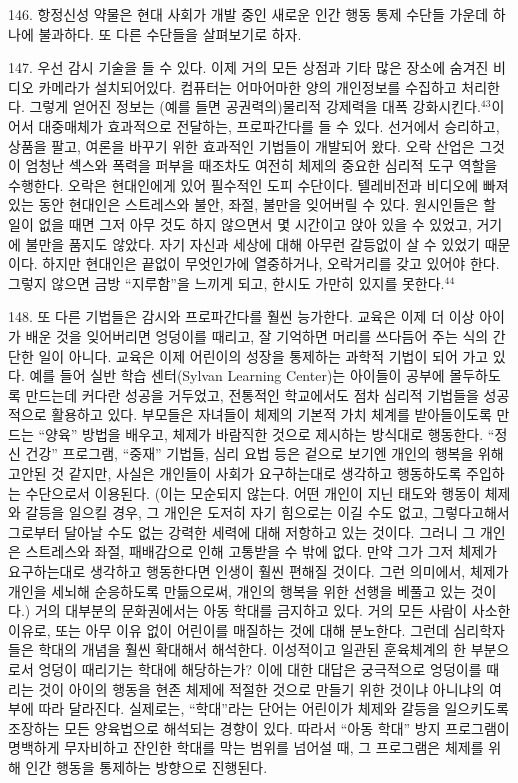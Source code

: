 \documentclass[11pt,a4paper]{article}
\begin{document}
\begin{multicols}{2}
146. 항정신성 약물은 현대 사회가 개발 중인 새로운 인간 행동 통제 수단들 가운데 하나에 불과하다. 또  다른 수단들을 살펴보기로 하자.  


147. 우선 감시 기술을 들 수 있다. 이제 거의 모든 상점과 기타 많은 장소에 숨겨진 비디오 카메라가  설치되어있다. 컴퓨터는 어마어마한 양의 개인정보를 수집하고 처리한다. 그렇게 얻어진 정보는 (예를  들면 공권력의)물리적 강제력을 대폭 강화시킨다.\hyperlink{43}{$^{43}$}이어서 대중매체가 효과적으로 전달하는,  프로파간다를 들 수 있다. 선거에서 승리하고, 상품을 팔고, 여론을 바꾸기 위한 효과적인 기법들이  개발되어 왔다. 오락 산업은 그것이 엄청난 섹스와 폭력을 퍼부을 때조차도 여전히 체제의 중요한 심리적  도구 역할을 수행한다. 오락은 현대인에게 있어 필수적인 도피 수단이다. 텔레비전과 비디오에 빠져있는  동안 현대인은 스트레스와 불안, 좌절, 불만을 잊어버릴 수 있다. 원시인들은 할 일이 없을 때면 그저 아무 것도 하지 않으면서 몇 시간이고 앉아 있을 수 있었고, 거기에 불만을 품지도 않았다. 자기 자신과 세상에  대해 아무런 갈등없이 살 수 있었기 때문이다. 하지만 현대인은 끝없이 무엇인가에 열중하거나,  오락거리를 갖고 있어야 한다. 그렇지 않으면 금방 “지루함”을 느끼게 되고, 한시도 가만히 있지를 못한다.\hyperlink{44}{$^{44}$}


148. 또 다른 기법들은 감시와 프로파간다를 훨씬 능가한다. 교육은 이제 더 이상 아이가 배운 것을  잊어버리면 엉덩이를 때리고, 잘 기억하면 머리를 쓰다듬어 주는 식의 간단한 일이 아니다. 교육은 이제  어린이의 성장을 통제하는 과학적 기법이 되어 가고 있다. 예를 들어 실반 학습 센터(Sylvan Learning Center)는 아이들이 공부에 몰두하도록 만드는데 커다란 성공을 거두었고, 전통적인 학교에서도 점차  심리적 기법들을 성공적으로 활용하고 있다. 부모들은 자녀들이 체제의 기본적 가치 체계를  받아들이도록 만드는 “양육” 방법을 배우고, 체제가 바람직한 것으로 제시하는 방식대로 행동한다. “정신 건강” 프로그램, “중재” 기법들, 심리 요법 등은 겉으로 보기엔 개인의 행복을 위해 고안된 것 같지만,  사실은 개인들이 사회가 요구하는대로 생각하고 행동하도록 주입하는 수단으로서 이용된다. (이는  모순되지 않는다. 어떤 개인이 지닌 태도와 행동이 체제와 갈등을 일으킬 경우, 그 개인은 도저히 자기  힘으로는 이길 수도 없고, 그렇다고해서 그로부터 달아날 수도 없는 강력한 세력에 대해 저항하고 있는  것이다. 그러니 그 개인은 스트레스와 좌절, 패배감으로 인해 고통받을 수 밖에 없다. 만약 그가 그저  체제가 요구하는대로 생각하고 행동한다면 인생이 훨씬 편해질 것이다. 그런 의미에서, 체제가 개인을  세뇌해 순응하도록 만듦으로써, 개인의 행복을 위한 선행을 베풀고 있는 것이다.) 거의 대부분의  문화권에서는 아동 학대를 금지하고 있다. 거의 모든 사람이 사소한 이유로, 또는 아무 이유 없이  어린이를 매질하는 것에 대해 분노한다. 그런데 심리학자들은 학대의 개념을 훨씬 확대해서 해석한다.  이성적이고 일관된 훈육체계의 한 부분으로서 엉덩이 때리기는 학대에 해당하는가? 이에 대한 대답은  궁극적으로 엉덩이를 때리는 것이 아이의 행동을 현존 체제에 적절한 것으로 만들기 위한 것이냐 아니냐의 여부에 따라 달라진다. 실제로는, “학대”라는 단어는 어린이가 체제와 갈등을 일으키도록  조장하는 모든 양육법으로 해석되는 경향이 있다. 따라서 “아동 학대” 방지 프로그램이 명백하게  무자비하고 잔인한 학대를 막는 범위를 넘어설 때, 그 프로그램은 체제를 위해 인간 행동을 통제하는  방향으로 진행된다.  



\end{multicols}
\end{document}
